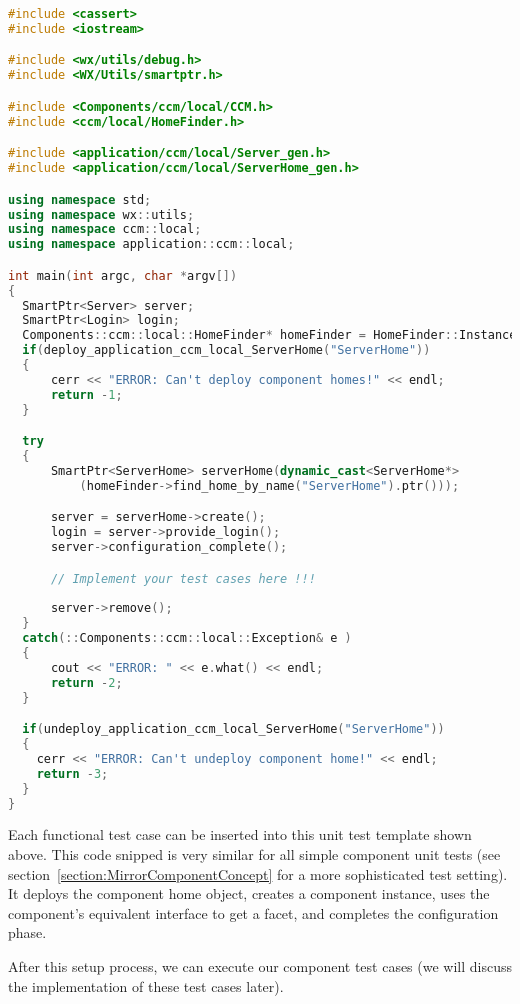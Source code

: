 \begin{footnotesize} 
\begin{lstlisting}[language=C++]
#include <cassert>
#include <iostream>

#include <wx/utils/debug.h>
#include <WX/Utils/smartptr.h>

#include <Components/ccm/local/CCM.h>
#include <ccm/local/HomeFinder.h>

#include <application/ccm/local/Server_gen.h>
#include <application/ccm/local/ServerHome_gen.h>

using namespace std;
using namespace wx::utils;
using namespace ccm::local;
using namespace application::ccm::local;

int main(int argc, char *argv[])
{
  SmartPtr<Server> server;
  SmartPtr<Login> login;
  Components::ccm::local::HomeFinder* homeFinder = HomeFinder::Instance();
  if(deploy_application_ccm_local_ServerHome("ServerHome")) 
  {
      cerr << "ERROR: Can't deploy component homes!" << endl;
      return -1;
  }

  try 
  {
      SmartPtr<ServerHome> serverHome(dynamic_cast<ServerHome*>
          (homeFinder->find_home_by_name("ServerHome").ptr()));

      server = serverHome->create();
      login = server->provide_login();
      server->configuration_complete();

      // Implement your test cases here !!!
    
      server->remove();
  } 
  catch(::Components::ccm::local::Exception& e ) 
  {
      cout << "ERROR: " << e.what() << endl;
      return -2;
  } 

  if(undeploy_application_ccm_local_ServerHome("ServerHome")) 
  {
    cerr << "ERROR: Can't undeploy component home!" << endl;
    return -3;
  }
}
\end{lstlisting}
\end{footnotesize}

Each functional test case can be inserted into this unit test template shown above.
This code snipped is very similar for all simple component unit tests 
(see section~\ref{section:MirrorComponentConcept} for a more sophisticated test
setting).
It deploys the component home object, creates a component instance, uses 
the component's equivalent interface to get a facet, and completes the
configuration phase. 

\vspace{3mm}
After this setup process, we can execute our component test cases (we will
discuss the implementation of these test cases later).

